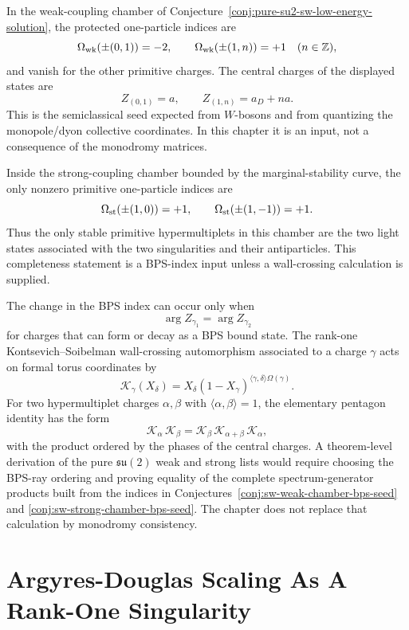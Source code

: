 \begin{conjecture}
\label{conj:sw-weak-chamber-bps-seed}
In the weak-coupling chamber of
Conjecture~\ref{conj:pure-su2-sw-low-energy-solution}, the protected
one-particle indices are
\[
  \Omega_{\rm wk}(\pm(0,1))=-2,\qquad
  \Omega_{\rm wk}(\pm(1,n))=+1\quad(n\in\mathbb Z),
\]
and vanish for the other primitive charges.  The central charges of the
displayed states are
\[
  Z_{(0,1)}=a,\qquad
  Z_{(1,n)}=a_D+na .
\]
This is the semiclassical seed expected from \(W\)-bosons and from quantizing
the monopole/dyon collective coordinates.  In this chapter it is an input, not
a consequence of the monodromy matrices.
\end{conjecture}

\begin{conjecture}
\label{conj:sw-strong-chamber-bps-seed}
Inside the strong-coupling chamber bounded by the marginal-stability curve, the
only nonzero primitive one-particle indices are
\[
  \Omega_{\rm st}(\pm(1,0))=+1,\qquad
  \Omega_{\rm st}(\pm(1,-1))=+1 .
\]
Thus the only stable primitive hypermultiplets in this chamber are the two
light states associated with the two singularities and their antiparticles.
This completeness statement is a BPS-index input unless a wall-crossing
calculation is supplied.
\end{conjecture}

The change in the BPS index can occur only when
\[
  \arg Z_{\gamma_1}=\arg Z_{\gamma_2}
\]
for charges that can form or decay as a BPS bound state.  The rank-one
Kontsevich--Soibelman wall-crossing automorphism associated to a charge
\(\gamma\) acts on formal torus coordinates by
\[
  \mathcal K_\gamma(X_\delta)
  =
  X_\delta(1-X_\gamma)^{\langle\gamma,\delta\rangle\Omega(\gamma)} .
\]
For two hypermultiplet charges \(\alpha,\beta\) with
\(\langle\alpha,\beta\rangle=1\), the elementary pentagon identity has the
form
\[
  \mathcal K_\alpha\,\mathcal K_\beta
  =
  \mathcal K_\beta\,\mathcal K_{\alpha+\beta}\,\mathcal K_\alpha ,
\]
with the product ordered by the phases of the central charges.  A theorem-level
derivation of the pure \(\mathfrak{su}(2)\) weak and strong lists would require
choosing the BPS-ray ordering and proving equality of the complete
spectrum-generator products built from the indices in
Conjectures~\ref{conj:sw-weak-chamber-bps-seed} and
\ref{conj:sw-strong-chamber-bps-seed}.  The chapter does not replace that
calculation by monodromy consistency.

\section{Argyres-Douglas Scaling As A Rank-One Singularity}
\label{sec:argyres-douglas-rank-one-singularity}

